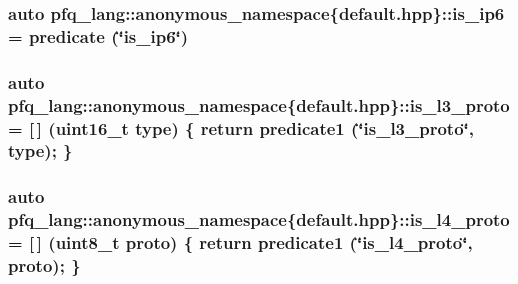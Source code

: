 \hypertarget{namespacepfq__lang_1_1anonymous__namespace_02default_8hpp_03_a107437a3539c86e92035db62e88b7d81}{
\subsubsection[{is\+\_\+ip6}]{\setlength{\rightskip}{0pt plus 5cm}auto pfq\+\_\+lang\+::anonymous\+\_\+namespace\{default.\+hpp\}\+::is\+\_\+ip6 = {\bf predicate} (\char`\"{}is\+\_\+ip6\char`\"{})}}\label{namespacepfq__lang_1_1anonymous__namespace_02default_8hpp_03_a107437a3539c86e92035db62e88b7d81}
\hypertarget{namespacepfq__lang_1_1anonymous__namespace_02default_8hpp_03_aa447a7b5765c5c5f9036de8358f86434}{
\subsubsection[{is\+\_\+l3\+\_\+proto}]{\setlength{\rightskip}{0pt plus 5cm}auto pfq\+\_\+lang\+::anonymous\+\_\+namespace\{default.\+hpp\}\+::is\+\_\+l3\+\_\+proto = \mbox{[}$\,$\mbox{]} (uint16\+\_\+t type) \{ return {\bf predicate1} (\char`\"{}is\+\_\+l3\+\_\+proto\char`\"{}, type); \}}}\label{namespacepfq__lang_1_1anonymous__namespace_02default_8hpp_03_aa447a7b5765c5c5f9036de8358f86434}
\hypertarget{namespacepfq__lang_1_1anonymous__namespace_02default_8hpp_03_ac2363f68f819b20eb7afc4acdcdd0bf0}{
\subsubsection[{is\+\_\+l4\+\_\+proto}]{\setlength{\rightskip}{0pt plus 5cm}auto pfq\+\_\+lang\+::anonymous\+\_\+namespace\{default.\+hpp\}\+::is\+\_\+l4\+\_\+proto = \mbox{[}$\,$\mbox{]} (uint8\+\_\+t proto) \{ return {\bf predicate1} (\char`\"{}is\+\_\+l4\+\_\+proto\char`\"{}, proto); \}}}\label{namespacepfq__lang_1_1anonymous__namespace_02default_8hpp_03_ac2363f68f819b20eb7afc4acdcdd0bf0}
